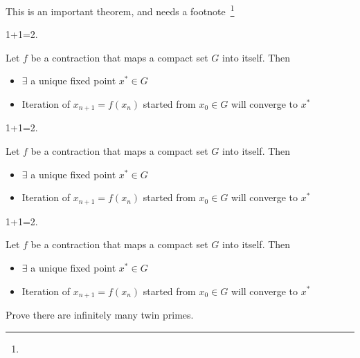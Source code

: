 \documentclass[USLetter,11pt]{report}
\begin{document}
\lipsum[1]
\begin{boxedexample}
    \lipsum[2]
\end{boxedexample}

This is an important theorem, and needs a footnote~\footnote{\lipsum[1]}
\begin{thm}
 1+1=2.
\end{thm}

\lipsum[8]

\begin{thm}[Banach] Let $f$ be a contraction that maps a compact set $G$ into itself. Then
    \begin{itemize}
        \item $\exists$ a unique fixed point $x^*\in G$
        \item Iteration of $x_{n+1}=f(x_n)$ started from $x_0\in G$ will converge to $x^*$
    \end{itemize}
\end{thm}



\begin{thm}
 1+1=2.
\end{thm}

\lipsum[8]

\begin{thm}[Banach] Let $f$ be a contraction that maps a compact set $G$ into itself. Then
    \begin{itemize}
        \item $\exists$ a unique fixed point $x^*\in G$
        \item Iteration of $x_{n+1}=f(x_n)$ started from $x_0\in G$ will converge to $x^*$
    \end{itemize}
\end{thm}

\lipsum[10-12]

\begin{thm}
 1+1=2.
\end{thm}

\lipsum[8]

\begin{thm}[Banach] Let $f$ be a contraction that maps a compact set $G$ into itself. Then
    \begin{itemize}
        \item $\exists$ a unique fixed point $x^*\in G$
        \item Iteration of $x_{n+1}=f(x_n)$ started from $x_0\in G$ will converge to $x^*$
    \end{itemize}
\end{thm}

\lipsum[4]
\begin{hwprob}
    Prove there are infinitely many twin primes.
\end{hwprob}


\begin{hwsoln}
    \lipsum[1-4]
\end{hwsoln}
\end{document}
